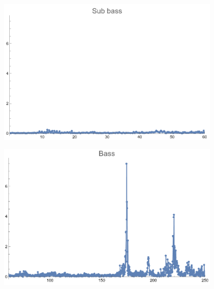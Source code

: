 \documentclass[12pt, letterpaper]{article}
\begin{document}
\begin{figure}[H]
  \centering
  \begin{minipage}{.5\textwidth}
    \centering
    \includegraphics[width=.9\linewidth]{imgs/Cancion7/subbass.png}
    \label{fig:07b}
  \end{minipage}%
  \begin{minipage}{.5\textwidth}
    \centering
    \includegraphics[width=.9\linewidth]{imgs/Cancion7/bass.png}
    \label{fig:07c}
  \end{minipage}
\end{figure}
\end{document}
